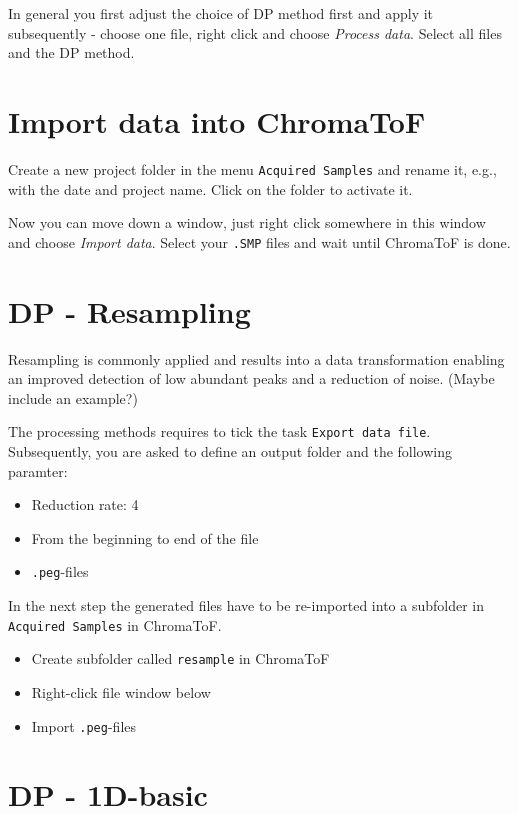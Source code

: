 \documentclass[]{book}
\providecommand{\tightlist}{%
  \setlength{\itemsep}{0pt}\setlength{\parskip}{0pt}}
\theoremstyle{definition}
\theoremstyle{definition}
\theoremstyle{definition}
\theoremstyle{remark}
\begin{document}
In general you first adjust the choice of DP method first and apply it
subsequently - choose one file, right click and choose \emph{Process
data}. Select all files and the DP method.

\section{Import data into ChromaToF}\label{import-data-into-chromatof}

Create a new project folder in the menu \texttt{Acquired\ Samples} and
rename it, e.g., with the date and project name. Click on the folder to
activate it.

Now you can move down a window, just right click somewhere in this
window and choose \emph{Import data}. Select your \texttt{.SMP} files
and wait until ChromaToF is done.

\section{DP - Resampling}\label{dp---resampling}

Resampling is commonly applied and results into a data transformation
enabling an improved detection of low abundant peaks and a reduction of
noise. (Maybe include an example?)

The processing methods requires to tick the task
\texttt{Export\ data\ file}. Subsequently, you are asked to define an
output folder and the following paramter:

\begin{itemize}
\tightlist
\item
  Reduction rate: 4
\item
  From the beginning to end of the file
\item
  \texttt{.peg}-files
\end{itemize}

In the next step the generated files have to be re-imported into a
subfolder in \texttt{Acquired\ Samples} in ChromaToF.

\begin{itemize}
\tightlist
\item
  Create subfolder called \texttt{resample} in ChromaToF
\item
  Right-click file window below
\item
  Import \texttt{.peg}-files
\end{itemize}

\section{DP - 1D-basic}\label{dp---1d-basic}
\end{document}

